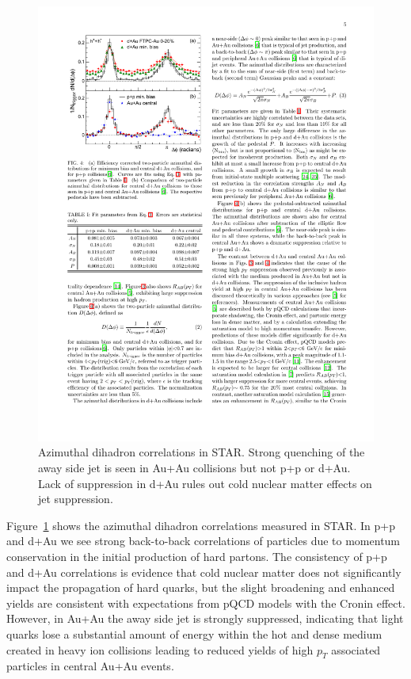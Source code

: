 \begin{figure}[htbp]
\begin{center}
\includegraphics[scale=1.2]{Plots/Intro/jet_quench.pdf}
\end{center}
\caption[Jet Quenching is STAR]{Azimuthal dihadron correlations in STAR. Strong quenching of the away side jet is seen in Au+Au collisions but not p+p or d+Au. Lack of suppression in d+Au rules out cold nuclear matter effects on jet suppression.}
\label{fig:jet_quench}
\end{figure}

Figure~\ref{fig:jet_quench} shows the azimuthal dihadron correlations measured in STAR. In p+p and d+Au we see strong back-to-back correlations of particles due to momentum conservation in the initial production of hard partons. The consistency of p+p and d+Au correlations is evidence that cold nuclear matter does not significantly impact the propagation of hard quarks, but the slight broadening and enhanced yields are consistent with expectations from pQCD models with the Cronin effect. However, in Au+Au the away side jet is strongly suppressed, indicating that light quarks lose a substantial amount of energy within the hot and dense medium created in heavy ion collisions leading to reduced yields of high $p_T$ associated particles in central Au+Au events.

